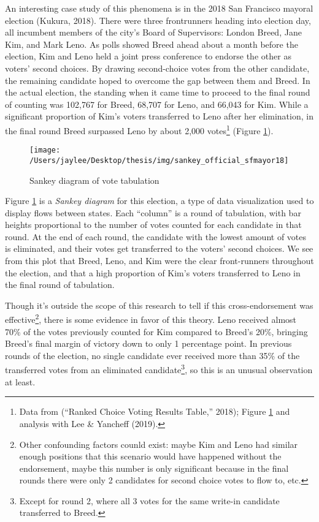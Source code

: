 \documentclass[12pt,twoside]{reedthesis}
\begin{document}
An interesting case study of this phenomena is in the 2018 San Francisco mayoral election (Kukura, 2018). There were three frontrunners heading into election day, all incumbent members of the city's Board of Supervisors: London Breed, Jane Kim, and Mark Leno. As polls showed Breed ahead about a month before the election, Kim and Leno held a joint press conference to endorse the other as voters' second choices. By drawing second-choice votes from the other candidate, the remaining candidate hoped to overcome the gap between them and Breed. In the actual election, the standing when it came time to proceed to the final round of counting was 102,767 for Breed, 68,707 for Leno, and 66,043 for Kim. While a significant proportion of Kim's voters transferred to Leno after her elimination, in the final round Breed surpassed Leno by about 2,000 votes\footnote{Data from (``Ranked Choice Voting Results Table,'' 2018); Figure \ref{fig:sankey} and analysis with Lee \& Yancheff (2019).} (Figure \ref{fig:sankey}).
\begin{figure}
\texttt{[image: /Users/jaylee/Desktop/thesis/img/sankey\_official\_sfmayor18]} \caption{Sankey diagram of vote tabulation}\label{fig:sankey}
\end{figure}
Figure \ref{fig:sankey} is a \emph{Sankey diagram} for this election, a type of data visualization used to display flows between states. Each ``column'' is a round of tabulation, with bar heights proportional to the number of votes counted for each candidate in that round. At the end of each round, the candidate with the lowest amount of votes is eliminated, and their votes get transferred to the voters' second choices. We see from this plot that Breed, Leno, and Kim were the clear front-runners throughout the election, and that a high proportion of Kim's voters transferred to Leno in the final round of tabulation.

Though it's outside the scope of this research to tell if this cross-endorsement was effective\footnote{Other confounding factors counld exist: maybe Kim and Leno had similar enough positions that this scenario would have happened without the endorsement, maybe this number is only significant because in the final rounds there were only 2 candidates for second choice votes to flow to, etc.}, there is some evidence in favor of this theory. Leno received almost 70\% of the votes previously counted for Kim compared to Breed's 20\%, bringing Breed's final margin of victory down to only 1 percentage point. In previous rounds of the election, no single candidate ever received more than 35\% of the transferred votes from an eliminated candidate\footnote{Except for round 2, where all 3 votes for the same write-in candidate transferred to Breed.}, so this is an unusual observation at least.
\end{document}
